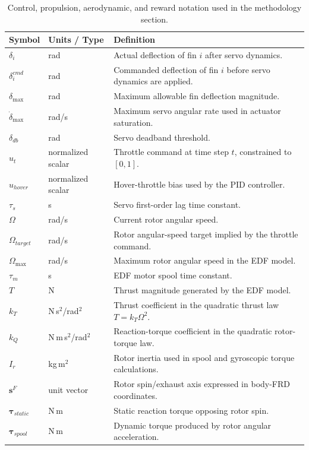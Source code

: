 \documentclass[10pt,twocolumn]{article}
\begin{document}
\begin{table}[!t]
\centering
\caption{Control, propulsion, aerodynamic, and reward notation used in the methodology section.}
\label{tab:notation_control}
\scriptsize
\renewcommand{\arraystretch}{0.97}
\begin{tabularx}{\textwidth}{@{}p{1.25in}p{1.50in}X@{}}
\toprule
Symbol & Units / Type & Definition \\
\midrule
$\delta_i$ & rad & Actual deflection of fin $i$ after servo dynamics. \\
$\delta_i^{cmd}$ & rad & Commanded deflection of fin $i$ before servo dynamics are applied. \\
$\delta_{\max}$ & rad & Maximum allowable fin deflection magnitude. \\
$\dot{\delta}_{\max}$ & rad/s & Maximum servo angular rate used in actuator saturation. \\
$\delta_{db}$ & rad & Servo deadband threshold. \\
$u_t$ & normalized scalar & Throttle command at time step $t$, constrained to $[0,1]$. \\
$u_{hover}$ & normalized scalar & Hover-throttle bias used by the PID controller. \\
$\tau_s$ & s & Servo first-order lag time constant. \\
$\Omega$ & rad/s & Current rotor angular speed. \\
$\Omega_{target}$ & rad/s & Rotor angular-speed target implied by the throttle command. \\
$\Omega_{\max}$ & rad/s & Maximum rotor angular speed in the EDF model. \\
$\tau_m$ & s & EDF motor spool time constant. \\
$T$ & N & Thrust magnitude generated by the EDF model. \\
$k_T$ & N\,s$^2$/rad$^2$ & Thrust coefficient in the quadratic thrust law $T=k_T\Omega^2$. \\
$k_Q$ & N\,m\,s$^2$/rad$^2$ & Reaction-torque coefficient in the quadratic rotor-torque law. \\
$I_r$ & kg\,m$^2$ & Rotor inertia used in spool and gyroscopic torque calculations. \\
$\mathbf{s}^{F}$ & unit vector & Rotor spin/exhaust axis expressed in body-FRD coordinates. \\
$\boldsymbol{\tau}_{static}$ & N\,m & Static reaction torque opposing rotor spin. \\
$\boldsymbol{\tau}_{spool}$ & N\,m & Dynamic torque produced by rotor angular acceleration. \\

\end{tabularx}
\end{table}
\end{document}
